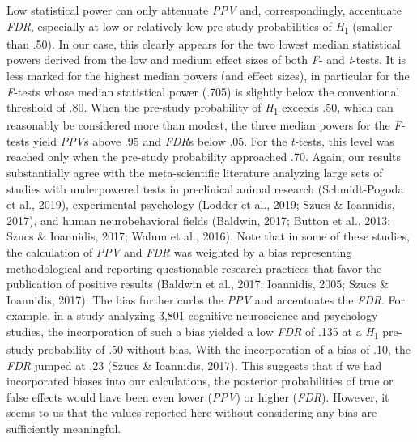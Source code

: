 \documentclass[authordate, meta, issue]{jote-new-article}
\begin{document}
	Low statistical power can only attenuate \emph{PPV} and, correspondingly, accentuate \emph{FDR}, especially at low or relatively low pre-study probabilities of \emph{H}\textsubscript{1} (smaller than .50). In our case, this clearly appears for the two lowest median statistical powers derived from the low and medium effect sizes of both \emph{F}- and \emph{t}-tests. It is less marked for the highest median powers (and effect sizes), in particular for the \emph{F}-tests whose median statistical power (.705) is slightly below the conventional threshold of .80. When the pre-study probability of \emph{H}\textsubscript{1} exceeds .50, which can reasonably be considered more than modest, the three median powers for the \emph{F}-tests yield \emph{PPV}s above .95 and \emph{FDR}s below .05. For the \emph{t-}tests, this level was reached only when the pre-study probability approached .70. Again, our results substantially agree with the meta-scientific literature analyzing large sets of studies with underpowered tests in preclinical animal research (Schmidt-Pogoda et al., 2019), experimental psychology (Lodder et al., 2019; Szucs \& Ioannidis, 2017), and human neurobehavioral fields (Baldwin, 2017; Button et al., 2013; Szucs \& Ioannidis, 2017; Walum et al., 2016). Note that in some of these studies, the calculation of \emph{PPV} and \emph{FDR} was weighted by a bias representing methodological and reporting questionable research practices that favor the publication of positive results (Baldwin et al., 2017; Ioannidis, 2005; Szucs \& Ioannidis, 2017). The bias further curbs the \emph{PPV} and accentuates the \emph{FDR}. For example, in a study analyzing 3,801 cognitive neuroscience and psychology studies, the incorporation of such a bias yielded a low \emph{FDR} of .135 at a \emph{H}\textsubscript{1} pre-study probability of .50 without bias. With the incorporation of a bias of .10, the \emph{FDR} jumped at .23 (Szucs \& Ioannidis, 2017). This suggests that if we had incorporated biases into our calculations, the posterior probabilities of true or false effects would have been even lower (\emph{PPV}) or higher (\emph{FDR}). However, it seems to us that the values reported here without considering any bias are sufficiently meaningful.
\end{document}
